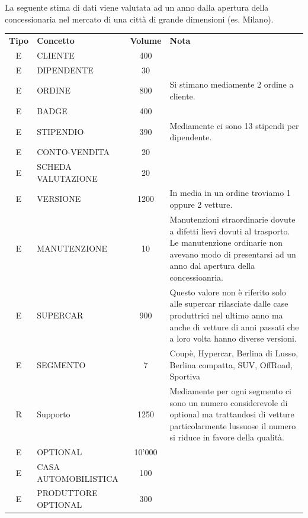 \documentclass[12pt]{article}
\begin{document}
La seguente stima di dati viene valutata ad un anno dalla apertura della
concessionaria nel mercato di una città di grande dimensioni (es. Milano). 

\begin{table}[htbp]
    \centering
    \small
    \begin{tabularx}{\textwidth}{c l c X }
        \rowcolor{red!20!}
        \textbf{Tipo} & \textbf{Concetto} & \textbf{Volume} & \textbf{Nota}\\
        E & CLIENTE & 400 & \\
        E & DIPENDENTE & 30 & \\
        E & ORDINE & 800 & Si stimano mediamente 2 ordine a cliente. \\
        E & BADGE & 400 & \\
        E & STIPENDIO & 390 & Mediamente ci sono 13 stipendi per dipendente. \\
        E & CONTO-VENDITA & 20 & \\
        E & SCHEDA VALUTAZIONE & 20 & \\
        E & VERSIONE & 1200 & In media in un ordine troviamo 1 oppure 2 vetture.
        \\
        E & MANUTENZIONE & 10 & Manutenzioni straordinarie dovute a difetti
                                lievi dovuti al trasporto. Le manutenzione
                                ordinarie non avevano modo di presentarsi ad un
                                anno dal apertura della concessioanria. \\
        E & SUPERCAR & 900 & Questo valore non è riferito solo alle supercar
                                rilasciate dalle case produttrici nel ultimo
                                anno ma anche di vetture di anni passati che a
                                loro volta hanno diverse versioni. \\
        
        E & SEGMENTO & 7 & Coupè, Hypercar, Berlina di Lusso, Berlina compatta,
        SUV, OffRoad, Sportiva \\
        R & Supporto & 1250 & Mediamente per ogni segmento ci sono un numero
                                considerevole di optional ma trattandosi di
                                vetture particolarmente lussuose il numero si
                                riduce in favore della qualità. \\
        E & OPTIONAL & 10'000 & \\
        E & CASA AUTOMOBILISTICA & 100 & \\
        E & PRODUTTORE OPTIONAL & 300 & \\  
        
    \end{tabularx}
    \label{tab:volume_table}
\end{table}
\end{document}
